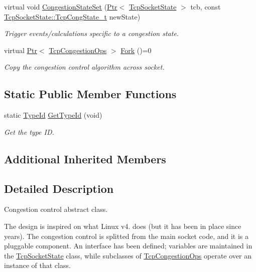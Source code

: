 \begin{DoxyCompactItemize}
virtual void \hyperlink{classns3_1_1TcpCongestionOps_a2777666dc7df24040d718ddba896928b}{Congestion\+State\+Set} (\hyperlink{classns3_1_1Ptr}{Ptr}$<$ \hyperlink{classns3_1_1TcpSocketState}{Tcp\+Socket\+State} $>$ tcb, const \hyperlink{classns3_1_1TcpSocketState_a6fc313945a33d48fd60cbffe0c787b19}{Tcp\+Socket\+State\+::\+Tcp\+Cong\+State\+\_\+t} new\+State)
\begin{DoxyCompactList}\small\item\em Trigger events/calculations specific to a congestion state. \end{DoxyCompactList}\item 
virtual \hyperlink{classns3_1_1Ptr}{Ptr}$<$ \hyperlink{classns3_1_1TcpCongestionOps}{Tcp\+Congestion\+Ops} $>$ \hyperlink{classns3_1_1TcpCongestionOps_a328ca18452bca8b4b62217e85fd29ac6}{Fork} ()=0
\begin{DoxyCompactList}\small\item\em Copy the congestion control algorithm across socket. \end{DoxyCompactList}\end{DoxyCompactItemize}
\subsection*{Static Public Member Functions}
\begin{DoxyCompactItemize}
\item 
static \hyperlink{classns3_1_1TypeId}{Type\+Id} \hyperlink{classns3_1_1TcpCongestionOps_a9ee58bfdea7f7fe0e477e234eeaebfbc}{Get\+Type\+Id} (void)
\begin{DoxyCompactList}\small\item\em Get the type ID. \end{DoxyCompactList}\end{DoxyCompactItemize}
\subsection*{Additional Inherited Members}


\subsection{Detailed Description}
Congestion control abstract class. 

The design is inspired on what Linux v4. does (but it has been in place since years). The congestion control is splitted from the main socket code, and it is a pluggable component. An interface has been defined; variables are maintained in the \hyperlink{classns3_1_1TcpSocketState}{Tcp\+Socket\+State} class, while subclasses of \hyperlink{classns3_1_1TcpCongestionOps}{Tcp\+Congestion\+Ops} operate over an instance of that class.

